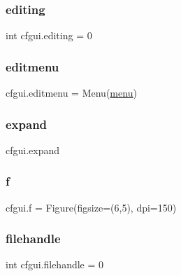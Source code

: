 \mbox{\label{namespacecfgui_aa3107f0b2f277f51f50bc28f5d93cb7e}} 
\subsubsection{\texorpdfstring{editing}{editing}}
{\footnotesize\ttfamily int cfgui.\+editing = 0}

\mbox{\label{namespacecfgui_afef0987be82596ace82157e0682cac34}} 
\subsubsection{\texorpdfstring{editmenu}{editmenu}}
{\footnotesize\ttfamily cfgui.\+editmenu = Menu(\mbox{\hyperlink{namespacecfgui_a178f690140e4928e80ed598ebbbf6ec1}{menu}})}

\mbox{\label{namespacecfgui_a584b910dd9e596e04fe616d866f91ff2}} 
\subsubsection{\texorpdfstring{expand}{expand}}
{\footnotesize\ttfamily cfgui.\+expand}

\mbox{\label{namespacecfgui_a64ae648845422a3c70e06f75eb5fa172}} 
\subsubsection{\texorpdfstring{f}{f}}
{\footnotesize\ttfamily cfgui.\+f = Figure(figsize=(6,5), dpi=150)}

\mbox{\label{namespacecfgui_a4f032350a6dae97371e2e21bcc0223f3}} 
\subsubsection{\texorpdfstring{filehandle}{filehandle}}
{\footnotesize\ttfamily int cfgui.\+filehandle = 0}

